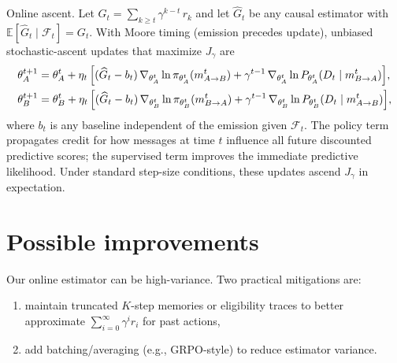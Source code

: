 \documentclass{article}
\theoremstyle{definition}
\begin{document}
Online ascent. Let $G_t = \sum_{k\ge t} \gamma^{k-t}\, r_k$ and let $\widehat G_t$ be any causal estimator with $\mathbb{E}[\widehat G_t\mid\mathcal{F}_t]=G_t$. With Moore timing (emission precedes update), unbiased stochastic-ascent updates that maximize $J_\gamma$ are
\begin{align*}
\theta_A^{t+1} &= \theta_A^t + \eta_t\,\Bigl[(\widehat G_t - b_t)\, \nabla_{\theta_A^t}\ln\pi_{\theta_A^t}(m_{A\to B}^t) + \gamma^{t-1}\, \nabla_{\theta_A^t}\ln P_{\theta_A^t}(D_t\mid m_{B\to A}^t)\Bigr],\\
\theta_B^{t+1} &= \theta_B^t + \eta_t\,\Bigl[(\widehat G_t - b_t)\, \nabla_{\theta_B^t}\ln\pi_{\theta_B^t}(m_{B\to A}^t) + \gamma^{t-1}\, \nabla_{\theta_B^t}\ln P_{\theta_B^t}(D_t\mid m_{A\to B}^t)\Bigr],
\end{align*}
where $b_t$ is any baseline independent of the emission given $\mathcal{F}_t$. The policy term propagates credit for how messages at time $t$ influence all future discounted predictive scores; the supervised term improves the immediate predictive likelihood. Under standard step-size conditions, these updates ascend $J_\gamma$ in expectation.

\section{Possible improvements}\label{sec:improvements}

Our online estimator can be high-variance. Two practical mitigations are:
\begin{enumerate}
\item maintain truncated $K$-step memories or eligibility traces to better approximate $\sum_{i=0}^{\infty} \gamma^i r_i$ for past actions,
\item add batching/averaging (e.g., GRPO-style) to reduce estimator variance.
\end{enumerate}
\end{document}
